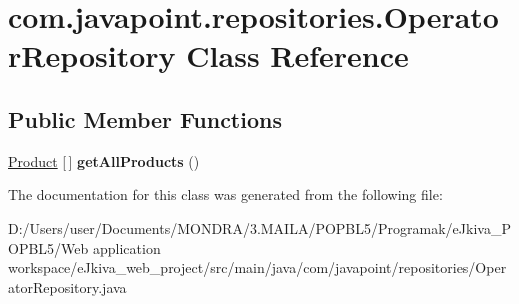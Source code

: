 \hypertarget{classcom_1_1javapoint_1_1repositories_1_1_operator_repository}{}\section{com.\+javapoint.\+repositories.\+Operator\+Repository Class Reference}
\label{classcom_1_1javapoint_1_1repositories_1_1_operator_repository}
\subsection*{Public Member Functions}
\begin{DoxyCompactItemize}
\item 
\mbox{\label{classcom_1_1javapoint_1_1repositories_1_1_operator_repository_a908c3836181e32abd54deaa57f6df8fe}} 
\mbox{\hyperlink{classprobe_hibernate_1_1_product}{Product}} \mbox{[}$\,$\mbox{]} {\bfseries get\+All\+Products} ()
\end{DoxyCompactItemize}


The documentation for this class was generated from the following file\+:\begin{DoxyCompactItemize}
\item 
D\+:/\+Users/user/\+Documents/\+M\+O\+N\+D\+R\+A/3.\+M\+A\+I\+L\+A/\+P\+O\+P\+B\+L5/\+Programak/e\+Jkiva\+\_\+\+P\+O\+P\+B\+L5/\+Web application workspace/e\+Jkiva\+\_\+web\+\_\+project/src/main/java/com/javapoint/repositories/Operator\+Repository.\+java\end{DoxyCompactItemize}
